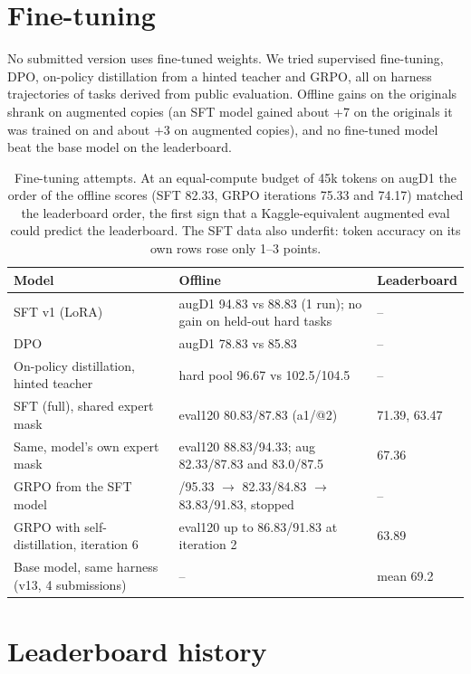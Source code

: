 \section{Fine-tuning}\label{app:ft}

No submitted version uses fine-tuned weights. We tried supervised fine-tuning, DPO, on-policy distillation from a hinted teacher and GRPO, all on harness trajectories of tasks derived from public evaluation. Offline gains on the originals shrank on augmented copies (an SFT model gained about +7 on the originals it was trained on and about +3 on augmented copies), and no fine-tuned model beat the base model on the leaderboard.

\begin{table}[H]\centering\small
\begin{tabularx}{\linewidth}{@{}>{\raggedright\arraybackslash}X>{\raggedright\arraybackslash}Xl@{}}
\toprule
Model & Offline & Leaderboard \\
\midrule
SFT v1 (LoRA) & augD1 94.83 vs 88.83 (1 run); no gain on held-out hard tasks & -- \\
DPO & augD1 78.83 vs 85.83 & -- \\
On-policy distillation, hinted teacher & hard pool 96.67 vs 102.5/104.5 & -- \\
SFT (full), shared expert mask & eval120 80.83/87.83 (a1/@2) & 71.39, 63.47 \\
Same, model's own expert mask & eval120 88.83/94.33; aug 82.33/87.83 and 83.0/87.5 & 67.36 \\
GRPO from the SFT model & 93.5/95.33 $\to$ 82.33/84.83 $\to$ 83.83/91.83, stopped & -- \\
GRPO with self-distillation, iteration 6 & eval120 up to 86.83/91.83 at iteration 2 & 63.89 \\
Base model, same harness (v13, 4 submissions) & -- & mean 69.2 \\
\bottomrule
\end{tabularx}
\caption{Fine-tuning attempts. At an equal-compute budget of 45k tokens on augD1 the order of the offline scores (SFT 82.33, GRPO iterations 75.33 and 74.17) matched the leaderboard order, the first sign that a Kaggle-equivalent augmented eval could predict the leaderboard. The SFT data also underfit: token accuracy on its own rows rose only 1--3 points.}
\end{table}

\section{Leaderboard history}\label{app:lb}


